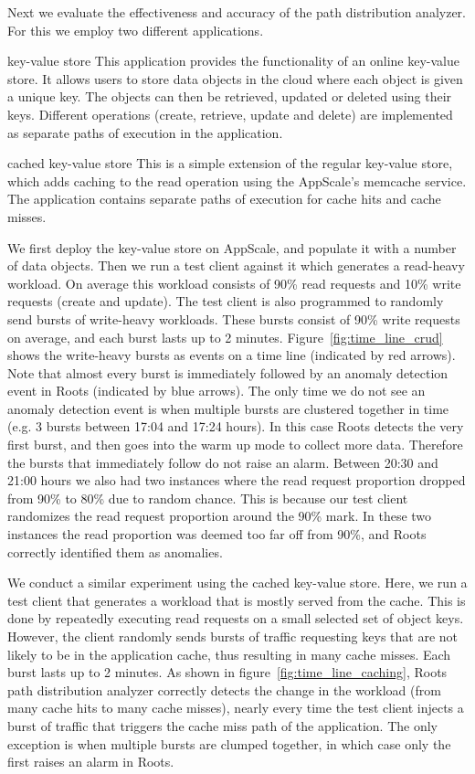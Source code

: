 Next we evaluate the effectiveness and accuracy of the path distribution analyzer. For this we 
employ two different applications.
\begin{LaTeXdescription}
\item[key-value store] This application provides the functionality of an online key-value store.  It allows 
users to store data objects in the cloud where each object is given a unique key. The objects can then be 
retrieved, updated or deleted using their keys. Different operations
(create, retrieve, update and delete) are implemented as separate paths of
execution in the application.
\item[cached key-value store] This is a simple extension of the regular key-value store, which adds
caching to the read operation using the AppScale's memcache service. The application contains
separate paths of execution for cache hits and cache misses.
\end{LaTeXdescription}

We first deploy the key-value store on AppScale, and populate it with a number of data objects. Then we
run a test client against it which generates a read-heavy workload. On average this workload
consists of 90\% read requests and 10\% write requests (create and update). The test client
is also programmed to randomly send bursts of write-heavy workloads. These bursts consist
of 90\% write requests on average, and each burst lasts up to 2 minutes. Figure~\ref{fig:time_line_crud}
shows the write-heavy bursts as events on a time line (indicated by red arrows). Note that almost every burst is
immediately followed by an anomaly detection event in Roots (indicated by blue arrows). 
The only time we do not see an anomaly detection event is when multiple
bursts are clustered together in time (e.g. 3 bursts between 17:04 and 17:24 hours). In this
case Roots detects the very first burst, and then goes into the warm up mode to collect more data. Therefore
the bursts that immediately follow do not raise an alarm. Between 20:30 and 21:00 hours we also
had two instances where the read request proportion dropped from 90\% to 80\% due to random
chance. This is because our test client randomizes the read request proportion around the 90\% mark. 
In these two instances the read proportion was deemed too far off from 90\%, and Roots correctly 
identified them as anomalies.

We conduct a similar experiment using the cached key-value store. Here, we run a test client that generates a workload
that is mostly served from the cache. This is done by repeatedly executing read requests on a small
selected set of object keys. However, the client randomly sends bursts of traffic requesting keys that
are not likely to be in the application cache, thus resulting in many cache misses. Each burst
lasts up to 2 minutes. As shown in 
figure~\ref{fig:time_line_caching}, Roots path distribution analyzer correctly detects the change 
in the workload (from many cache hits to many cache misses), nearly every time the test client injects a 
burst of traffic that triggers the cache miss path of the application. The only exception is when
multiple bursts are clumped together, in which case only the first raises an alarm in Roots.


